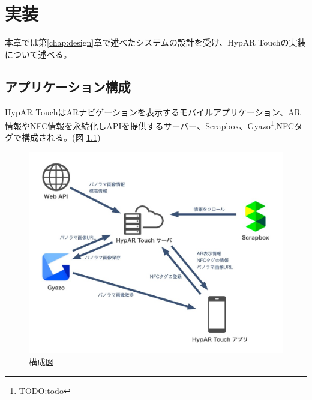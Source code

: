\chapter{実装}
\label{chap:implementation}

本章では第\ref{chap:design}章で述べたシステムの設計を受け、HypAR Touchの実装について述べる。

\newpage

\section{アプリケーション構成}
HypAR TouchはARナビゲーションを表示するモバイルアプリケーション、AR情報やNFC情報を永続化しAPIを提供するサーバー、Scrapbox、Gyazo\footnote{\textsf{TODO:todo}},NFCタグで構成される。(図 \ref{fig:application_structure})

\begin{figure}[htbp]
  \centering
  \includegraphics[width=150mm]{images/application_structure.jpg}
  \caption{構成図} \label{fig:application_structure}
\end{figure}

